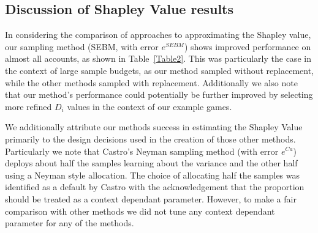 
\subsection{Discussion of Shapley Value results}\label{subsection:discussion_shapley}

In considering the comparison of approaches to approximating the Shapley value, our sampling method (SEBM, with error $e^{SEBM}$) shows improved performance on almost all accounts, as shown in Table~\ref{Table2}.
This was particularly the case in the context of large sample budgets, as our method sampled without replacement, while the other methods sampled with replacement.
Additionally we also note that our method's performance could potentially be further improved by selecting more refined $D_i$ values in the context of our example games.

We additionally attribute our methods success in estimating the Shapley Value primarily to the design decisions used in the creation of those other methods.
Particularly we note that Castro's Neyman sampling method (with error $e^{Ca}$) deploys about half the samples learning about the variance and the other half using a Neyman style allocation.
The choice of allocating half the samples was identified as a default by Castro with the acknowledgement that the proportion should be treated as a context dependant parameter.
However, to make a fair comparison with other methods we did not tune any context dependant parameter for any of the methods.

